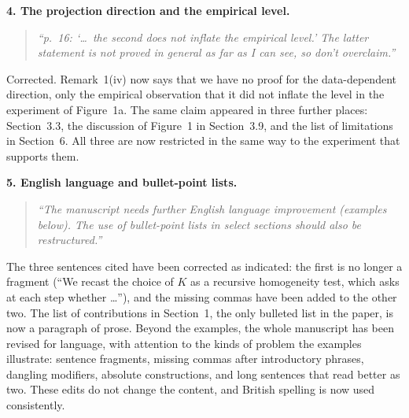 \documentclass[11pt]{article}
\newcommand{\R}[1]{\medskip\noindent\textbf{#1}\quad}
\newenvironment{rquote}{\begin{quote}\itshape}{\end{quote}}
\begin{document}
\R{4. The projection direction and the empirical level.}
\begin{rquote}
``p.~16: `\dots\ the second does not inflate the empirical level.' The latter
statement is not proved in general as far as I can see, so don't overclaim.''
\end{rquote}
Corrected. Remark~1(iv) now says that we have no proof for the data-dependent
direction, only the empirical observation that it did not inflate the level in
the experiment of Figure~1a. The same claim appeared in three further places:
Section~3.3, the discussion of Figure~1 in Section~3.9, and the list of
limitations in Section~6. All three are now restricted in the same way to the
experiment that supports them.

\R{5. English language and bullet-point lists.}
\begin{rquote}
``The manuscript needs further English language improvement (examples below).
The use of bullet-point lists in select sections should also be
restructured.''
\end{rquote}
The three sentences cited have been corrected as indicated: the first is no
longer a fragment (``We recast the choice of $K$ as a recursive homogeneity
test, which asks at each step whether \dots''), and the missing commas have
been added to the other two. The list of contributions in Section~1, the only
bulleted list in the paper, is now a paragraph of prose. Beyond the examples,
the whole manuscript has been revised for language, with attention to the
kinds of problem the examples illustrate: sentence fragments, missing commas
after introductory phrases, dangling modifiers, absolute constructions, and
long sentences that read better as two. These edits do not change the
content, and British spelling is now used consistently.
\end{document}
